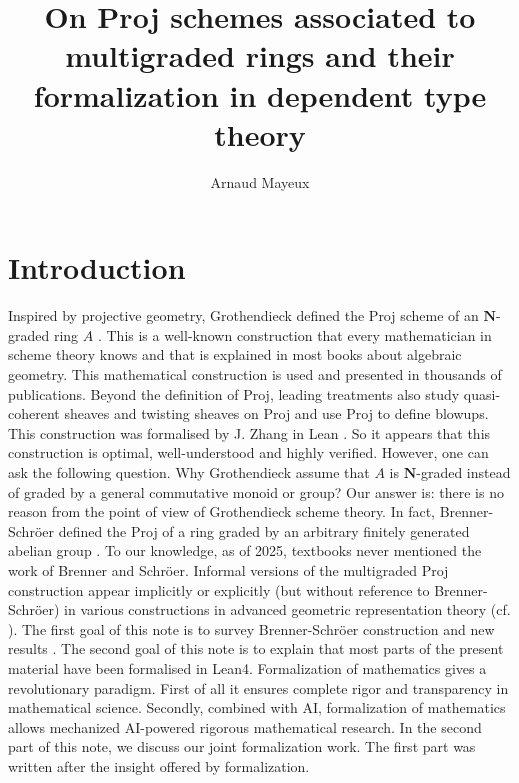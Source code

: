 \documentclass[graybox]{svmult}
\begin{document}
\title*{On Proj schemes associated to multigraded rings and their formalization in dependent type theory}
\author{Arnaud Mayeux}

%
%
\maketitle




\section*{Introduction}
Inspired by projective geometry, Grothendieck defined the Proj scheme of an $\mathbf{N}$-graded ring $A$ \cite{Gr61}. This is a well-known construction that every mathematician in scheme theory knows and that is explained in most books about algebraic geometry. This mathematical construction is used and presented in thousands of publications. 
Beyond the definition of Proj, leading treatments also study quasi-coherent sheaves and twisting sheaves on Proj and use Proj to define blowups.  
This construction was formalised by J. Zhang in Lean \cite{Z23}. 
So it appears that this construction is optimal, well-understood and highly verified.  
However, one can ask the following question. Why Grothendieck assume that $A$ is $\mathbf{N}$-graded instead of graded by a general commutative monoid or group? 
Our answer is: there is no reason from the point of view of Grothendieck scheme theory. In fact, Brenner-Schröer defined the Proj of a ring graded by an arbitrary finitely generated abelian group \cite{BS03}.
To our knowledge, as of 2025, textbooks never mentioned the work of Brenner and Schröer.
 Informal versions of the multigraded Proj construction appear implicitly or
explicitly (but without reference to Brenner-Schröer) in various constructions in advanced geometric representation theory (cf. \cite{MR24}).
The first goal of this note is to survey Brenner-Schröer construction and new results \cite{BS03, MR24, MZ25}. The second goal of this note is to explain that most parts of the present material have been formalised in Lean4. Formalization of mathematics gives a revolutionary paradigm. First of all it ensures complete rigor and transparency in mathematical science. Secondly, combined with AI, formalization of mathematics allows mechanized AI-powered rigorous mathematical research. In the second part of this note, we discuss our joint formalization work. The first part was written after the insight offered by formalization. 
\end{document}
